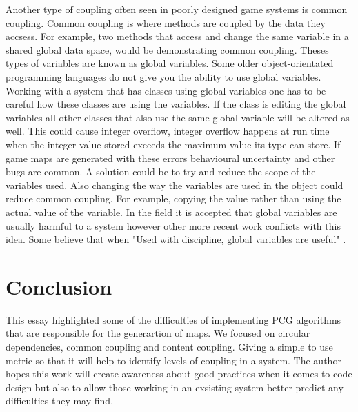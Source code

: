 \documentclass{scrartcl}
\begin{document}
Another type of coupling often seen in poorly designed game systems is common coupling. Common coupling is where methods are coupled by the data they accsess\cite{briand1999unified}. For example, two methods that access and change the same variable in a shared global data space, would be demonstrating common coupling. Theses types of variables are known as global variables. Some older object-orientated programming languages do not give you the ability to use global variables. Working with a system that has classes using global variables one has to be careful how these classes are using the variables. If the class is editing the global variables all other classes that also use the same global variable will be altered as well. This could cause integer overflow, integer overflow happens at run time when the integer value stored exceeds the maximum value its type can store\cite{muntean2015smt}. If game maps are generated with these errors behavioural uncertainty and other bugs are common. A solution could be to try and reduce the scope of the variables used. Also changing the way the variables are used in the object could reduce common coupling. For example, copying the value rather than using the actual value of the variable. In the field it is accepted that global variables are usually harmful to a system\cite {wulf1973global} however other more recent work conflicts with this idea. Some believe that when "Used with discipline, global variables are useful"\cite [p.338]{mcconnell2004code} .

\section{Conclusion}
This essay highlighted some of the difficulties of implementing PCG algorithms that are responsible for the generartion of maps. We focused on circular dependencies, common coupling and content coupling. Giving a simple to use metric so that it will help to identify levels of coupling in a system. The author hopes this work will create awareness about good practices when it comes to code design but also to allow those working in an exsisting system better predict any difficulties they may find.  



\end{document}
